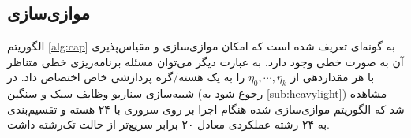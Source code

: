 \subsection{موازی‌سازی}
الگوریتم \ref{alg:cap} به گونه‌ای تعریف شده است که امکان موازی‌سازی و مقیاس‌پذیری آن به صورت خطی وجود دارد. به عبارت دیگر می‌توان مسئله برنامه‌ریزی خطی متناظر با هر مقداردهی از
$\eta_0, \cdots, \eta_k$
را به یک هسته/گره پردازشی خاص اختصاص داد. در شبیه‌سازی سناریو وظایف سبک و سنگین (رجوع شود به \ref{sub:heavylight}) مشاهده شد که الگوریتم موازی‌سازی شده هنگام اجرا بر روی سروری با ۲۴ هسته و تقسیم‌بندی به ۲۴ رشته عملکردی معادل ۲۰ برابر سریع‌تر از حالت تک‌رشته داشت.